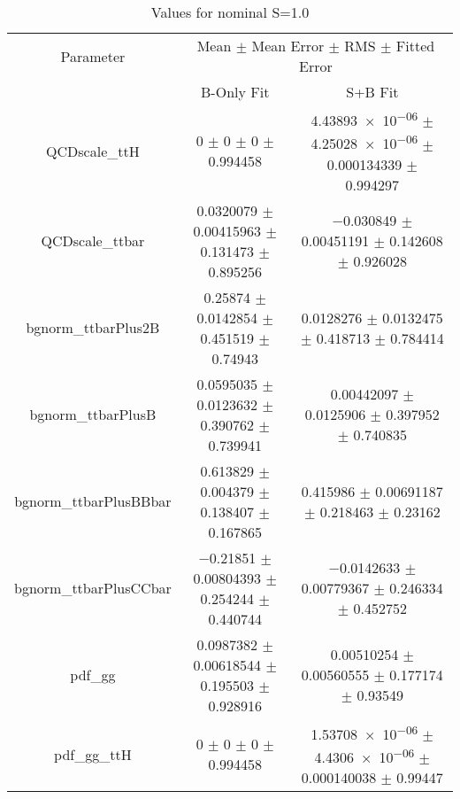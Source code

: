 \begin{table}
\centering
\caption{Values for nominal S=1.0}
\begin{tabular}{ccc}
\toprule
Parameter & \multicolumn{2}{c}{Mean $\pm$ Mean Error $\pm$ RMS $\pm$ Fitted Error}\\
 & B-Only Fit & S+B Fit\\
\midrule
QCDscale\_ttH & \num{0} $\pm$ \num{0} $\pm$ \num{0} $\pm$ \num{0.994458} & \num{4.43893e-06} $\pm$ \num{4.25028e-06} $\pm$ \num{0.000134339} $\pm$ \num{0.994297}\\
QCDscale\_ttbar & \num{0.0320079} $\pm$ \num{0.00415963} $\pm$ \num{0.131473} $\pm$ \num{0.895256} & \num{-0.030849} $\pm$ \num{0.00451191} $\pm$ \num{0.142608} $\pm$ \num{0.926028}\\
bgnorm\_ttbarPlus2B & \num{0.25874} $\pm$ \num{0.0142854} $\pm$ \num{0.451519} $\pm$ \num{0.74943} & \num{0.0128276} $\pm$ \num{0.0132475} $\pm$ \num{0.418713} $\pm$ \num{0.784414}\\
bgnorm\_ttbarPlusB & \num{0.0595035} $\pm$ \num{0.0123632} $\pm$ \num{0.390762} $\pm$ \num{0.739941} & \num{0.00442097} $\pm$ \num{0.0125906} $\pm$ \num{0.397952} $\pm$ \num{0.740835}\\
bgnorm\_ttbarPlusBBbar & \num{0.613829} $\pm$ \num{0.004379} $\pm$ \num{0.138407} $\pm$ \num{0.167865} & \num{0.415986} $\pm$ \num{0.00691187} $\pm$ \num{0.218463} $\pm$ \num{0.23162}\\
bgnorm\_ttbarPlusCCbar & \num{-0.21851} $\pm$ \num{0.00804393} $\pm$ \num{0.254244} $\pm$ \num{0.440744} & \num{-0.0142633} $\pm$ \num{0.00779367} $\pm$ \num{0.246334} $\pm$ \num{0.452752}\\
pdf\_gg & \num{0.0987382} $\pm$ \num{0.00618544} $\pm$ \num{0.195503} $\pm$ \num{0.928916} & \num{0.00510254} $\pm$ \num{0.00560555} $\pm$ \num{0.177174} $\pm$ \num{0.93549}\\
pdf\_gg\_ttH & \num{0} $\pm$ \num{0} $\pm$ \num{0} $\pm$ \num{0.994458} & \num{1.53708e-06} $\pm$ \num{4.4306e-06} $\pm$ \num{0.000140038} $\pm$ \num{0.99447}\\
\bottomrule
\end{tabular}
\end{table}